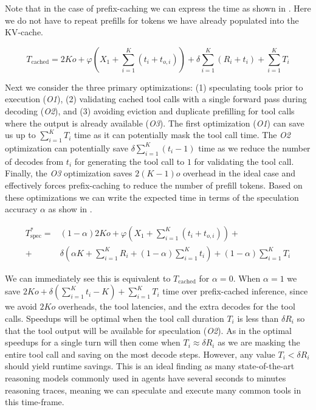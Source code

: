 Note that in the case of prefix-caching we can express the time as shown in . Here we do not have to repeat prefills for
tokens we have already populated into the KV-cache.

\begin{equation}\label{eq:spec-engine-pref-cache}
    T_{\textrm{cached}} = 2Ko + \varphi\left(X_1 + \sum_{i=1}^{K}(t_i+t_{o,i})\right) + \delta\sum_{i=1}^{K}(R_i+t_i) + \sum_{i=1}^{K} T_i
\end{equation}










Next we consider the three primary optimizations: (1) speculating tools prior to execution (\emph{O1}), (2) validating cached tool calls with a single forward pass during decoding (\emph{O2}), and (3) avoiding eviction and duplicate prefilling for tool calls where the output is already available (\emph{O3}).
The first optimization (\emph{O1}) can save us up to $\sum_{i=1}^K T_i$ time as it can potentially mask the tool call time.
The \emph{O2} optimization can potentially save $\delta \sum_{i=1}^K (t_i-1)$ time as we reduce the number of decodes from $t_i$ for generating the tool call to $1$ for validating the tool call.
Finally, the \emph{O3} optimization saves $2(K-1)o$ overhead in the ideal case and effectively forces prefix-caching to reduce the number of prefill tokens.
Based on these optimizations we can write the expected time in terms of the speculation accuracy $\alpha$ as show in .

\begin{align}\label{eq:spec-engine}
    T^{\ast}_{\textrm{spec}} =& (1-\alpha)2Ko + \varphi\left(X_1 + \sum_{i=1}^{K}(t_i+t_{o,i})\right) + \nonumber \\
    +& \delta \left(\alpha K + \sum_{i=1}^K R_i + (1-\alpha)\sum_{i=1}^K t_i\right) + (1-\alpha)\sum_{i=1}^K T_i
\end{align}

We can immediately see this is equivalent to $T_{\textrm{cached}}$ for $\alpha=0$. When $\alpha=1$ we save $2Ko + \delta(\sum_{i=1}^K t_i - K) + \sum_{i=1}^K T_i$ time over prefix-cached inference, since we avoid $2Ko$ overheads, the tool latencies, and the extra decodes for the tool calls.
Speedups will be optimal when the tool call duration $T_i$ is less than $\delta R_i$ so that the tool output will be available for speculation (\emph{O2}).
As in  the optimal speedups for a single turn will then come when $T_i\approx \delta R_i$ as we are masking the entire tool call and saving on the most decode steps.
However, any value $T_i<\delta R_i$ should yield runtime savings.
This is an ideal finding as many state-of-the-art reasoning models commonly used in agents have several seconds to minutes reasoning traces, meaning we can speculate and execute many common tools in this time-frame. 












